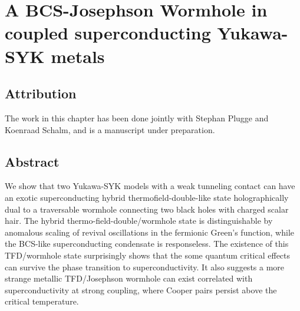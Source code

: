\chapter{A BCS-Josephson Wormhole in coupled superconducting Yukawa-SYK metals}
\label{chap:JosephsonWormhole}

\section*{Attribution}
The work in this chapter has been done jointly with Stephan Plugge and Koenraad Schalm, and is a manuscript under preparation.

\section*{Abstract}
\noindent
We show that two Yukawa-SYK models with a weak tunneling contact can have an exotic superconducting hybrid thermofield-double-like state holographically dual to a traversable wormhole connecting two black holes with charged scalar hair. 
The hybrid thermo-field-double/wormhole state is distinguishable by anomalous scaling of revival oscillations in the fermionic Green's function, while the BCS-like superconducting condensate is responseless. 
The existence of this TFD/wormhole state surprisingly shows that the some quantum critical effects can survive the phase transition to superconductivity. It also suggests a more strange metallic TFD/Josephson wormhole can exist correlated with superconductivity at strong coupling, where Cooper pairs persist above the critical temperature.


